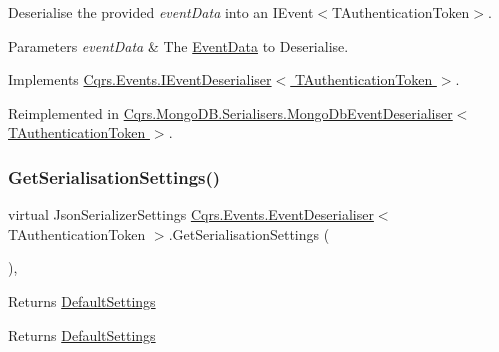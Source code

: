 Deserialise the provided {\itshape event\+Data}  into an I\+Event$<$\+T\+Authentication\+Token$>$. 


\begin{DoxyParams}{Parameters}
{\em event\+Data} & The \hyperlink{classCqrs_1_1Events_1_1EventData}{Event\+Data} to Deserialise.\\
\hline
\end{DoxyParams}


Implements \hyperlink{interfaceCqrs_1_1Events_1_1IEventDeserialiser_af9216046631ed941bb96b58a0cc27f22_af9216046631ed941bb96b58a0cc27f22}{Cqrs.\+Events.\+I\+Event\+Deserialiser$<$ T\+Authentication\+Token $>$}.



Reimplemented in \hyperlink{classCqrs_1_1MongoDB_1_1Serialisers_1_1MongoDbEventDeserialiser_a2ea63367d97bf66e3dffcabb8c53005e_a2ea63367d97bf66e3dffcabb8c53005e}{Cqrs.\+Mongo\+D\+B.\+Serialisers.\+Mongo\+Db\+Event\+Deserialiser$<$ T\+Authentication\+Token $>$}.

\mbox{\label{classCqrs_1_1Events_1_1EventDeserialiser_a3f767a1b793ea47bcafd9c64be47619e_a3f767a1b793ea47bcafd9c64be47619e}} 
\subsubsection{\texorpdfstring{Get\+Serialisation\+Settings()}{GetSerialisationSettings()}}
{\footnotesize\ttfamily virtual Json\+Serializer\+Settings \hyperlink{classCqrs_1_1Events_1_1EventDeserialiser}{Cqrs.\+Events.\+Event\+Deserialiser}$<$ T\+Authentication\+Token $>$.Get\+Serialisation\+Settings (\begin{DoxyParamCaption}{ }\end{DoxyParamCaption})\hspace{0.3cm}{\ttfamily [protected]}, {\ttfamily [virtual]}}



Returns \hyperlink{classCqrs_1_1Events_1_1EventDeserialiser_a08bd067ca7ce8c28c7a83d444b7e468b_a08bd067ca7ce8c28c7a83d444b7e468b}{Default\+Settings} 

\begin{DoxyReturn}{Returns}
\hyperlink{classCqrs_1_1Events_1_1EventDeserialiser_a08bd067ca7ce8c28c7a83d444b7e468b_a08bd067ca7ce8c28c7a83d444b7e468b}{Default\+Settings}
\end{DoxyReturn}


